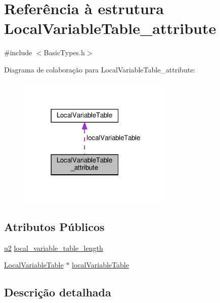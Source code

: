 \hypertarget{structLocalVariableTable__attribute}{}\section{Referência à estrutura Local\+Variable\+Table\+\_\+attribute}
\label{structLocalVariableTable__attribute}


{\ttfamily \#include $<$Basic\+Types.\+h$>$}



Diagrama de colaboração para Local\+Variable\+Table\+\_\+attribute\+:\nopagebreak
\begin{figure}[H]
\begin{center}
\leavevmode
\includegraphics[width=213pt]{structLocalVariableTable__attribute__coll__graph}
\end{center}
\end{figure}
\subsection*{Atributos Públicos}
\begin{DoxyCompactItemize}
\item 
\hyperlink{BasicTypes_8h_a732cde1300aafb73b0ea6c2558a7a54f}{u2} \hyperlink{structLocalVariableTable__attribute_a64ee9d68a72f161a074d912bc0b8802f}{local\+\_\+variable\+\_\+table\+\_\+length}
\item 
\hyperlink{structLocalVariableTable}{Local\+Variable\+Table} $\ast$ \hyperlink{structLocalVariableTable__attribute_aac0a6412785ab3e1be4ec14b381a4eba}{local\+Variable\+Table}
\end{DoxyCompactItemize}


\subsection{Descrição detalhada}



